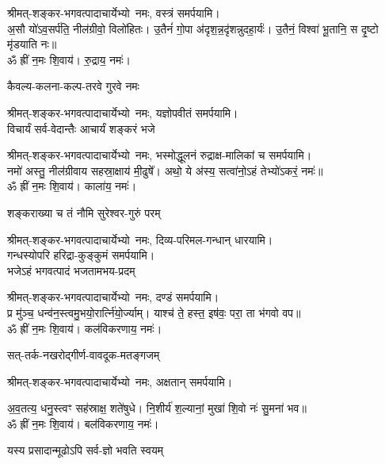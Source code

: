 \begin{center}
श्रीमत्-शङ्कर-भगवत्पादाचार्येभ्यो~नमः, वस्त्रं समर्पयामि।\\

अ॒सौ यो॑ऽव॒सर्प॑ति॒ नील॑ग्रीवो॒ विलो॑हितः। उ॒तैनं॑ गो॒पा अ॑दृश॒न्न॒दृ॑शन्नुदहा॒र्यः॑। उ॒तैनं॒ विश्वा॑ भू॒तानि॒ स दृ॒ष्टो मृ॑डयाति नः॥\\
ॐ ह्रीं न॒मः शि॒वाय॑। रु॒द्राय॒ नमः॑।

{कैवल्य-कलना-कल्प-तरवे गुरवे नमः}

श्रीमत्-शङ्कर-भगवत्पादाचार्येभ्यो~नमः, यज्ञोपवीतं समर्पयामि। \\

{विचार्यं सर्व-वेदान्तैः आचार्यं शङ्करं भजे}

श्रीमत्-शङ्कर-भगवत्पादाचार्येभ्यो~नमः, भस्मोद्धूलनं रुद्राक्ष-मालिकां च समर्पयामि।\\

नमो॑ अस्तु॒ नील॑ग्रीवाय सहस्रा॒क्षाय॑ मी॒ढुषे᳚। अथो॒ ये अ॑स्य॒ सत्वा॑नो॒ऽहं तेभ्यो॑ऽकरं॒ नमः॑॥\\
ॐ ह्रीं न॒मः शि॒वाय॑। काला॑य॒ नमः॑। 

{शङ्कराख्या च तं नौमि सुरेश्वर-गुरुं परम्}

श्रीमत्-शङ्कर-भगवत्पादाचार्येभ्यो~नमः, दिव्य-परिमल-गन्धान् धारयामि।\\ गन्धस्योपरि हरिद्रा-कुङ्कुमं समर्पयामि।\\

{भजेऽहं भगवत्पादं भजतामभय-प्रदम्}

श्रीमत्-शङ्कर-भगवत्पादाचार्येभ्यो~नमः, दण्डं समर्पयामि।\\

प्र मु॑ञ्च॒ धन्व॑न॒स्त्वमु॒भयो॒रार्त्नि॑यो॒र्ज्याम्। याश्च॑ ते॒ हस्त॒ इष॑वः॒ परा॒ ता भ॑गवो वप॥\\
ॐ ह्रीं न॒मः शि॒वाय॑। कल॑विकरणाय॒ नमः॑। 

{सत्-तर्क-नखरोद्गीर्ण-वावदूक-मतङ्गजम्}

श्रीमत्-शङ्कर-भगवत्पादाचार्येभ्यो~नमः, अक्षतान् समर्पयामि।

अ॒व॒तत्य॒ धनु॒स्त्वꣳ सह॑स्राक्ष॒ शते॑षुधे। नि॒शीर्य॑ श॒ल्यानां॒ मुखा॑ शि॒वो नः॑ सु॒मना॑ भव॥\\
ॐ ह्रीं न॒मः शि॒वाय॑। बल॑विकरणाय॒ नमः॑। 

{यस्य प्रसादान्मूढोऽपि सर्व-ज्ञो भवति स्वयम्}


\end{center}
